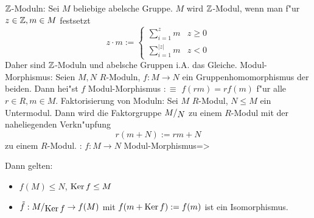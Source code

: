 \example $\mathbb Z$-Moduln:{
  Sei $M$ beliebige abelsche Gruppe. $M$ wird $\mathbb Z$-Modul, wenn man
  f"ur $z\in\mathbb Z,m\in M$ festsetzt
  \[ z\cdot m:=\begin{cases} 
      \sum_{i=1}^z m & z\ge 0 \\ \sum_{i=1}^{|z|} m & z<0 
      \end{cases}
    \]
  Daher sind $\mathbb Z$-Moduln und abelsche Gruppen i.A. das Gleiche.
  }
 Modul-Morphismus:{
  Seien $M,N$ $R$-Moduln, $f:M\to N$ ein Gruppenhomomorphismus der beiden.
  Dann hei"st $f$ Modul-Morphismus $:\equiv$ $f(rm)=rf(m)$ f"ur alle
  $r\in R,m\in M$.
  }
\remark Faktorisierung von Moduln:{
  Sei $M$ $R$-Modul, $N\le M$ ein Untermodul. Dann wird die
  Faktorgruppe $\rcoset M N$ zu einem $R$-Modul mit der naheliegenden 
  Verkn"upfung
  \[r(m+N):=rm+N
    \]
  zu einem $R$-Modul.
  }
\theorem: $f:M\to N$ Modul-Morphismus=>{
  Dann gelten:
  \begin{itemize}
    \item $f(M)\le N$, $\operatorname{Ker} f\le M$
    \item $\tilde f:\rcoset M {\Kern f}\to f(M)$ mit $f(m+\operatorname{Ker} f):=f(m)$
      ist ein Isomorphismus.
    \end{itemize}
  }
